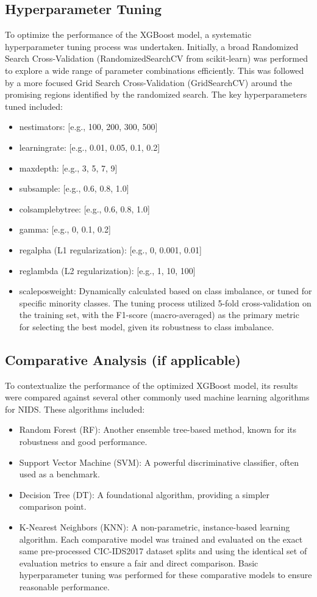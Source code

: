 \subsection{Hyperparameter Tuning}
To optimize the performance of the XGBoost model, a systematic hyperparameter tuning process was undertaken. Initially, a broad Randomized Search Cross-Validation (RandomizedSearchCV from scikit-learn) was performed to explore a wide range of parameter combinations efficiently. This was followed by a more focused Grid Search Cross-Validation (GridSearchCV) around the promising regions identified by the randomized search. The key hyperparameters tuned included:
\begin{itemize}
	\item n\textunderscore estimators: [e.g., 100, 200, 300, 500]
	\item learning\textunderscore rate: [e.g., 0.01, 0.05, 0.1, 0.2]
	\item max\textunderscore depth: [e.g., 3, 5, 7, 9]
	\item subsample: [e.g., 0.6, 0.8, 1.0]
	\item colsample\textunderscore bytree: [e.g., 0.6, 0.8, 1.0]
	\item gamma: [e.g., 0, 0.1, 0.2]
	\item reg\textunderscore alpha (L1 regularization): [e.g., 0, 0.001, 0.01]
	\item  reg\textunderscore lambda (L2 regularization): [e.g., 1, 10, 100]
	\item scale\textunderscore pos\textunderscore weight: Dynamically calculated based on class imbalance, or tuned for specific minority classes. The tuning process utilized 5-fold cross-validation on the training set, with the F1-score (macro-averaged) as the primary metric for selecting the best model, given its robustness to class imbalance.
\end{itemize}

\subsection{Comparative Analysis (if applicable)}
To contextualize the performance of the optimized XGBoost model, its results were compared against several other commonly used machine learning algorithms for NIDS. These algorithms included:
\begin{itemize}
	\item Random Forest (RF): Another ensemble tree-based method, known for its robustness and good performance.
	\item Support Vector Machine (SVM): A powerful discriminative classifier, often used as a benchmark.
	\item Decision Tree (DT): A foundational algorithm, providing a simpler comparison point.
	\item K-Nearest Neighbors (KNN): A non-parametric, instance-based learning algorithm. Each comparative model was trained and evaluated on the exact same pre-processed CIC-IDS2017 dataset splits and using the identical set of evaluation metrics to ensure a fair and direct comparison. Basic hyperparameter tuning was performed for these comparative models to ensure reasonable performance.
\end{itemize}

